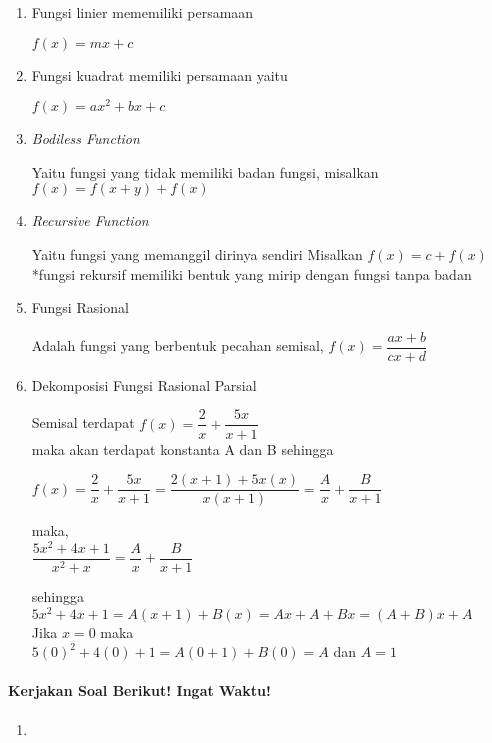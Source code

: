\documentclass[12pt,a4paper,draft,final,oneside,twoside,openright,openany]{article}
\begin{document}
\begin{enumerate}
\begin{enumerate}
					\item Fungsi linier mememiliki persamaan 
						\begin{center}
							$f(x)=mx+c$
						\end{center}
					\item Fungsi kuadrat memiliki persamaan yaitu
						\begin{center}
							$f(x)=ax^2+bx+c$
						\end{center}
					\item \textit{Bodiless Function}
						\begin{center}
							Yaitu fungsi yang tidak memiliki badan fungsi, misalkan
							$f(x)=f(x+y)+f(x)$
						\end{center}
					\item \textit{Recursive Function}
						\begin{center}
							Yaitu fungsi yang memanggil dirinya sendiri
							Misalkan 
							$f(x)=c+f(x)$\\
							*fungsi rekursif memiliki bentuk yang mirip dengan fungsi tanpa badan
						\end{center}
						\item Fungsi Rasional
							\begin{center}
								Adalah fungsi yang berbentuk pecahan semisal,
								$f(x)=\dfrac{ax+b}{cx+d}$
							\end{center}
						\item Dekomposisi Fungsi Rasional Parsial
							\begin{center}
								Semisal terdapat $f(x)=\dfrac{2}{x}+\dfrac{5x}{x+1}$
								\\
								maka akan terdapat konstanta A dan B sehingga 
								
								$f(x)=\dfrac{2}{x}+\dfrac{5x}{x+1}=\dfrac{2(x+1)+5x(x)}{x(x+1)}=\dfrac{A}{x}+\dfrac{B}{x+1} $
								
								maka,\\
								
								$\dfrac{5x^2+4x+1}{x^2+x}=\dfrac{A}{x}+\dfrac{B}{x+1}$
								
								sehingga\\
								
								$5x^2+4x+1=A(x+1)+B(x)=Ax+A+Bx=(A+B)x+A$\\
								
								Jika $x=0$ maka\\
								
								$5(0)^2+4(0)+1=A(0+1)+B(0)=A$ dan $A=1$\\
								
								
							\end{center}
						
				\end{enumerate}
				
			

		
		\end{enumerate}
		
		\noindent\makebox[\linewidth]{\rule{\paperwidth}{0.4pt}}
		\paragraph{Kerjakan Soal Berikut! Ingat Waktu!}
		\begin{enumerate}
			\item 
		\end{enumerate}
		
\end{document}
